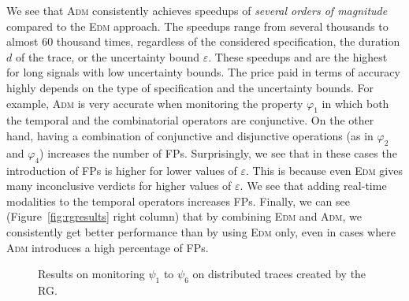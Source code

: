 We see that \textsc{Adm} consistently achieves speedups of \emph{several orders of magnitude} 
compared to the \textsc{Edm} approach.
The speedups range from several thousands to almost 60 thousand times, regardless of the considered specification, the duration $d$ of the trace, or the uncertainty bound $\varepsilon$.
These speedups and are the highest for long signals with low uncertainty bounds.
The price paid in terms of accuracy highly depends on the type of specification and the uncertainty bounds.
For example, \textsc{Adm} is very accurate when monitoring the property $\varphi_1$ in which both the temporal and the combinatorial operators are conjunctive.
On the other hand, having a combination of conjunctive and disjunctive operations (as in $\varphi_{2}$ and $\varphi_{4}$) increases the number of FPs.
Surprisingly, we see that in these cases the introduction of FPs is higher for lower values of $\varepsilon$.
This is because even \textsc{Edm} gives many inconclusive verdicts for higher values of $\varepsilon$.
We see that adding real-time modalities to the temporal operators increases FPs.
Finally, we can see (Figure~\ref{fig:rgresults} right column) that by combining \textsc{Edm} and \textsc{Adm}, we consistently get better performance than by using \textsc{Edm} only, even in cases where \textsc{Adm} introduces a high percentage of FPs.


\begin{figure}[t]
	\begin{center}
		\caption{Results on monitoring $\psi_1$ to $\psi_6$ on distributed traces created by the RG.}	\label{fig:rgresultsOnline}
	\end{center}
\end{figure}


